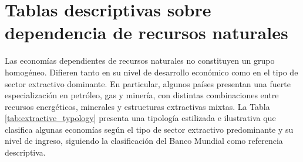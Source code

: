 \documentclass[../../PTFM.tex]{subfiles}
\begin{document}
	\section{Tablas descriptivas sobre dependencia de recursos naturales}
	\label{sec:tablas}

	Las economías dependientes de recursos naturales no constituyen un grupo homogéneo. Difieren tanto en su nivel de desarrollo económico como en el tipo de sector extractivo dominante. En particular, algunos países presentan una fuerte especialización en petróleo, gas y minería, con distintas combinaciones entre recursos energéticos, minerales y estructuras extractivas mixtas. La Tabla \ref{tab:extractive_typology} presenta una tipología estilizada e ilustrativa que clasifica algunas economías según el tipo de sector extractivo predominante y su nivel de ingreso, siguiendo la clasificación del Banco Mundial como referencia descriptiva.
\end{document}

